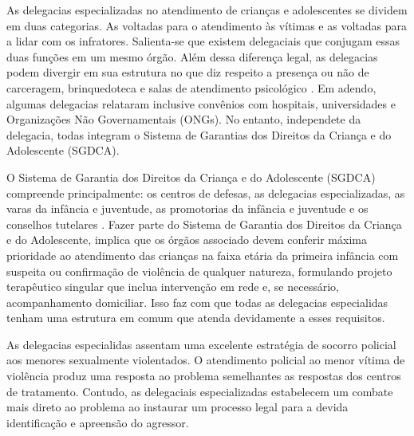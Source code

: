 As delegacias especializadas no atendimento de crianças e adolescentes se dividem em duas categorias. As voltadas para o atendimento às vítimas e as voltadas para a lidar com os infratores. Salienta-se que existem delegaciais que conjugam essas duas funções em um mesmo órgão. Além dessa diferença legal, as delegacias podem divergir em sua estrutura no que diz respeito a presença ou não de carceragem, brinquedoteca e salas de atendimento psicológico \cite{novo2016}.
Em adendo, algumas delegacias relataram inclusive convênios com hospitais, universidades e Organizações Não Governamentais (ONGs). No entanto, independete da delegacia, todas integram o Sistema de Garantias dos Direitos da Criança e do Adolescente (SGDCA).

O Sistema de Garantia dos Direitos da Criança e do Adolescente (SGDCA) compreende principalmente: os centros de defesas, as delegacias especializadas, as varas da infância e juventude, as promotorias da infância e juventude e os conselhos tutelares \cite{rodrigues2014}. %
Fazer parte do Sistema de Garantia dos Direitos da Criança e do Adolescente, implica que os órgãos associado devem conferir máxima prioridade ao atendimento das crianças na faixa etária da primeira infância com suspeita ou confirmação de violência de qualquer natureza, formulando projeto terapêutico singular que inclua intervenção em rede e, se necessário, acompanhamento domiciliar. Isso faz com que todas as delegacias especialidas tenham uma estrutura em comum que atenda devidamente a esses requisitos. 

As delegacias especialidas assentam uma excelente estratégia de socorro policial aos menores sexualmente violentados. O atendimento policial ao menor vítima de violência produz uma resposta ao problema semelhantes as respostas dos centros de tratamento. Contudo, as delegaciais especializadas estabelecem um combate mais direto ao problema ao instaurar um processo legal para a devida identificação e apreensão do agressor.



